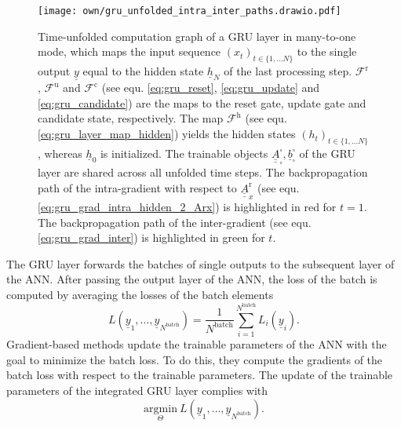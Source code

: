 \begin{figure}
    \centering
    \texttt{[image: own/gru\_unfolded\_intra\_inter\_paths.drawio.pdf]}
    \caption[
        Unfolded GRU in many-to-one mode
    ]{
        Time-unfolded computation graph of a GRU layer in many-to-one mode,
        which maps
        the input sequence $\left(x_t\right)_{t\in\{1,\dots N\}}$ 
        to the single output $\underline y$ equal to the
        hidden state $\underline h_N$ of the last processing step.
        $\mathcal{F}^\text{r}$,
        $\mathcal{F}^\text{u}$
        and $\mathcal{F}^\text{c}$
        (see equ. \ref{eq:gru_reset}, \ref{eq:gru_update} and \ref{eq:gru_candidate})
        are the maps to the
        reset gate, update gate and candidate state, respectively.
        The map 
        $\mathcal{F}^\text{h}$ 
        (see equ. \ref{eq:gru_layer_map_hidden})
        yields the hidden states 
        $\left(h_t\right)_{t\in\{1,\dots N\}}$,
        whereas $\underline h_0$ is initialized.
        The trainable objects
        $\underline{\underline{A}}^\square_\square, \underline{b}^\square_\square$
        of the GRU layer
        are shared across all unfolded time steps.
        The backpropagation path of the intra-gradient with respect to 
        $\underline{\underline{A}}^\text{r}_x$
        (see equ. \ref{eq:gru_grad_intra_hidden_2_Arx}) 
        is highlighted in red for $t=1$.
        The backpropagation path of the inter-gradient 
        (see equ. \ref{eq:gru_grad_inter}) 
        is highlighted in green
        for $t$.
        \label{fig:gru_unfolded}}
\end{figure}
The GRU layer forwards the batches of 
single outputs to the subsequent layer of the ANN.
After passing the output layer of the ANN, the loss
of the batch is computed by averaging the losses of the batch elements
\begin{equation} \label{eq:loss_of_batch}
    L\left(\underline y_1, \dots, \underline y_{N^\text{batch}}\right) 
    = 
    \frac{1}{N^\text{batch}}
    \sum_{i=1}^{N^\text{batch}} L_i \left(\underline y_i\right).
\end{equation}
Gradient-based methods update the trainable parameters 
of the ANN with the goal to minimize the batch loss. 
To do this, they compute the gradients of the batch loss 
with respect to the trainable parameters. 
The update of the trainable parameters of the integrated GRU layer 
complies with
\begin{equation}
    \underset{\Theta}{\mathrm{argmin}}\ 
    L\left(\underline y_1, \dots, \underline y_{N^\text{batch}}\right).
\end{equation}
